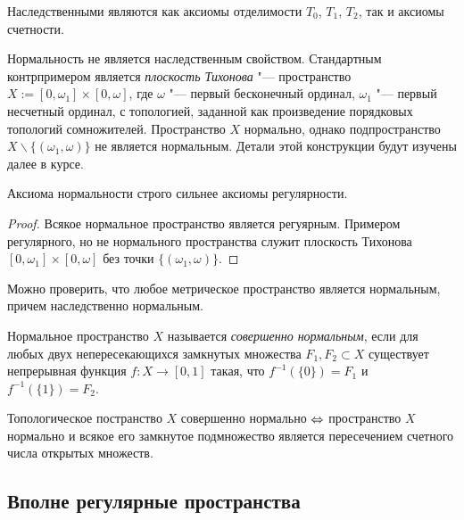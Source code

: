 \begin{note}
    Наследственными являются как аксиомы отделимости $T_0$, $T_1$, $T_2$, так и аксиомы счетности.
\end{note}

\begin{note}
    Нормальность не является наследственным свойством. Стандартным контрпримером является \textit{плоскость Тихонова} "--- пространство $X := [0, \omega_1]\times [0, \omega]$, где $\omega$ "--- первый бесконечный ординал, $\omega_1$ "--- первый несчетный ординал, с топологией, заданной как произведение порядковых топологий сомножителей. Пространство $X$ нормально, однако подпространство $X \backslash \lbrace(\omega_1,\omega)\rbrace$ не является нормальным. Детали этой конструкции будут изучены далее в курсе.
\end{note}

\begin{corollary}
    Аксиома нормальности строго сильнее аксиомы регулярности.
\end{corollary}

\begin{proof}
    Всякое нормальное пространство является регуярным. Примером регулярного, но не нормального пространства служит плоскость Тихонова $[0, \omega_1]\times [0, \omega]$ без точки $\lbrace(\omega_1,\omega)\rbrace$.
\end{proof}

\begin{note}
    Можно проверить, что любое метрическое пространство является нормальным, причем наследственно нормальным.
\end{note}

\begin{definition}
    Нормальное пространство $X$ называется \textit{совершенно нормальным}, если для любых двух непересекающихся замкнутых множества $F_1, F_2 \subset X$ существует непрерывная функция $f: X\rightarrow [0, 1]$ такая, что $f^{-1}(\lbrace 0\rbrace) = F_1$ и $f^{-1}(\lbrace 1\rbrace) = F_2$.
\end{definition}

\begin{theorem}
    Топологическое постранство $X$ совершенно нормально $\Leftrightarrow$ пространство $X$ нормально и всякое его замкнутое подмножество является пересечением счетного числа открытых множеств.
\end{theorem}

\subsection{Вполне регулярные пространства}

